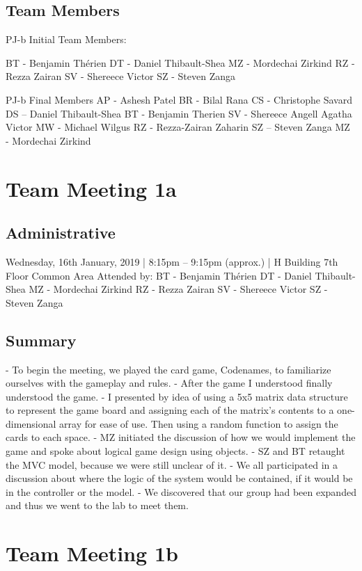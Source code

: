 \documentclass[12pt]{article}
\begin{document}
\subsection{Team Members}
PJ-b Initial Team Members:

BT - Benjamin Thérien 
DT - Daniel Thibault-Shea
MZ - Mordechai Zirkind 
RZ - Rezza Zairan 
SV - Shereece Victor
SZ - Steven Zanga 

PJ-b Final Members 
AP - Ashesh Patel
BR - Bilal Rana
CS - Christophe Savard
DS – Daniel Thibault-Shea
BT - Benjamin Therien
SV - Shereece Angell Agatha Victor
MW - Michael Wilgus
RZ - Rezza-Zairan Zaharin
SZ – Steven Zanga
MZ - Mordechai Zirkind

\pagebreak
\section{Team Meeting 1a }

\subsection{Administrative}
Wednesday, 16th January, 2019 | 8:15pm – 9:15pm (approx.) | H Building 7th Floor Common Area 
Attended by: 
BT - Benjamin Thérien 
DT - Daniel Thibault-Shea 
MZ - Mordechai Zirkind 
RZ - Rezza Zairan 
SV - Shereece Victor 
SZ - Steven Zanga


\subsection{Summary}
-	To begin the meeting, we played the card game, Codenames, to familiarize ourselves with the gameplay and rules. 
-	After the game I understood finally understood the game. 
-	I presented by idea of using a 5x5 matrix data structure to represent the game board and assigning each of the matrix’s contents to a one-dimensional array for ease of use. Then using a random function to assign the cards to each space. 
-	MZ initiated the discussion of how we would implement the game and spoke about logical game design using objects.
-	SZ and BT retaught the MVC model, because we were still unclear of it. 
-	We all participated in a discussion about where the logic of the system would be contained, if it would be in the controller or the model. 
-	We discovered that our group had been expanded and thus we went to the lab to meet them. 



\pagebreak
\section{Team Meeting 1b }
\end{document}
